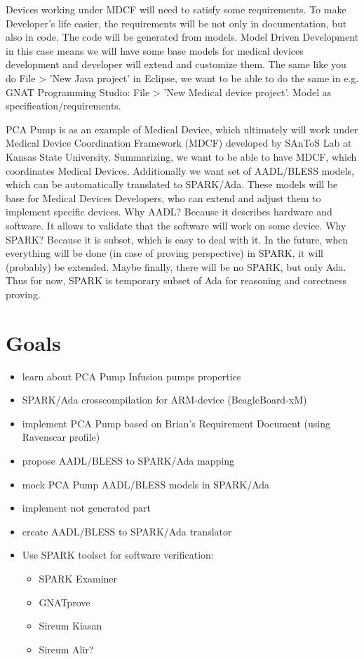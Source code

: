 Devices working under MDCF will need to satisfy some requirements. To make Developer's life easier, the requirements will be not only in documentation, but also in code. The code will be generated from models.
Model Driven Development in this case means we will have some base models for medical devices development and developer will extend and customize them. The same like you do File > 'New Java project' in Eclipse, we want to be able to do the same in e.g. GNAT Programming Studio: File > 'New Medical device project'.
Model as specification/requirements.

PCA Pump is as an example of Medical Device, which ultimately will work under Medical Device Coordination Framework (MDCF) developed by SAnToS Lab at Kansas State University.
Summarizing, we want to be able to have MDCF, which coordinates Medical Devices. Additionally we want set of AADL/BLESS models, which can be automatically translated to SPARK/Ada. These models will be base for Medical Devices Developers, who can extend and adjust them to implement specific devices. 
Why AADL? Because it describes hardware and software. It allows to validate that the software will work on some device.
Why SPARK? Because it is subset, which is easy to deal with it. In the future, when everything will be done (in case of proving perspective) in SPARK, it will (probably) be extended. Maybe finally, there will be no SPARK, but only Ada. Thus for now, SPARK is temporary subset of Ada for reasoning and corectness proving.


\section{Goals}
\label{introduction:goals}
\begin{itemize}
	\item learn about PCA Pump Infusion pumps properties
	\item SPARK/Ada crosscompilation for ARM-device (BeagleBoard-xM)
	\item implement PCA Pump based on Brian's Requirement Document (using Ravenscar profile)
	\item propose AADL/BLESS to SPARK/Ada mapping
	\item mock PCA Pump AADL/BLESS models in SPARK/Ada
	\item implement not generated part
	\item create AADL/BLESS to SPARK/Ada translator
	\item Use SPARK toolset for software verification:
		\begin{itemize}
			\item SPARK Examiner
			\item GNATprove
			\item Sireum Kiasan
			\item Sireum Alir?
		\end{itemize}
\end{itemize}




